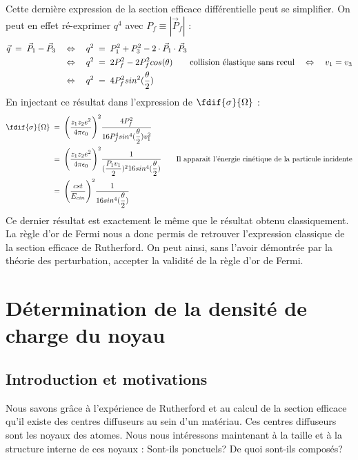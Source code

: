 Cette dernière expression de la section efficace différentielle peut se simplifier. On peut en effet ré-exprimer $q^4$ avec $P_f \equiv |\vec{P}_f|$ :
\begin{align*}
    \vec{q} \; = \; \vec{P}_1 - \vec{P}_3
        &\quad \Leftrightarrow \quad
    q^2 \; = \; P_1^2 + P_3^2 - 2 \cdot \vec{P}_1 \cdot \vec{P}_3\\
        &\quad \Leftrightarrow \quad
    q^2 \; = \; 2 P_f^2 - 2 P_f^2 cos(\theta)
    \qquad \text{collision élastique sans recul} \quad \Leftrightarrow \quad v_1=v_3\\
        &\quad \Leftrightarrow \quad
    q^2 \; = \; 4 P_f^2 sin^2(\dfrac{\theta}{2})
\end{align*}
En injectant ce résultat dans l'expression de  $\fdif{\sigma}{\Omega}$ :
\begin{align*}
    \fdif{\sigma}{\Omega}
        &\eq
    \Bigg( \dfrac{z_1 z_2e^2}{4\pi\epsilon_0} \Bigg)^2 
    \dfrac{4 P_f^2}{16 P_f^4 sin^4(\dfrac{\theta}{2})v^2_1}\\
        &\eq
    \Bigg( \dfrac{z_1 z_2e^2}{4\pi\epsilon_0} \Bigg)^2
    \dfrac{1}{ (\dfrac{P_1v_1}{2})^2 16sin^4(\dfrac{\theta}{2})}
    \qquad \text{Il apparaît l'énergie cinétique de la particule incidente}\\
    &\eq
    \Bigg( \dfrac{cst}{E_{cin}} \Bigg)^2
    \dfrac{1}{16sin^4(\dfrac{\theta}{2})}
\end{align*}
Ce dernier résultat est exactement le même que le résultat obtenu classiquement. La règle d'or de Fermi nous a donc permis de retrouver l'expression classique de la section efficace de Rutherford. On peut ainsi, sans l'avoir démontrée par la théorie des perturbation, accepter la validité de la règle d'or de Fermi.






\section{Détermination de la densité de charge du noyau}

\subsection{Introduction et motivations}

Nous savons grâce à l'expérience de Rutherford et au calcul de la section efficace qu'il existe des centres diffuseurs au sein d'un matériau. Ces centres diffuseurs sont les noyaux des atomes. Nous nous intéressons maintenant à la taille et à la structure interne de ces noyaux : Sont-ils ponctuels? De quoi sont-ils composés?\\

